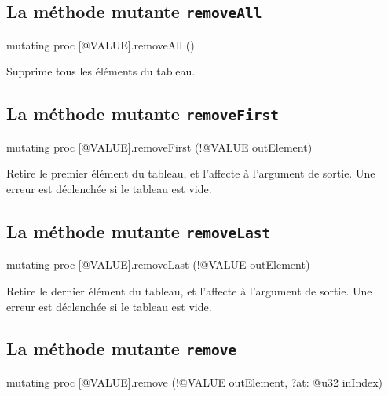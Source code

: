 \subsection{La méthode mutante \texttt{removeAll}}

\begin{galgas4box}
mutating proc [@VALUE].removeAll ()
\end{galgas4box}

Supprime tous les éléments du tableau.





\subsection{La méthode mutante \texttt{removeFirst}}

\begin{galgas4box}
mutating proc [@VALUE].removeFirst (!@VALUE outElement)
\end{galgas4box}

Retire le premier élément du tableau, et l'affecte à l'argument de sortie. Une erreur est déclenchée si le tableau est vide.







\subsection{La méthode mutante \texttt{removeLast}}

\begin{galgas4box}
mutating proc [@VALUE].removeLast (!@VALUE outElement)
\end{galgas4box}

Retire le dernier élément du tableau, et l'affecte à l'argument de sortie. Une erreur est déclenchée si le tableau est vide.








\subsection{La méthode mutante \texttt{remove}}

\begin{galgas4box}
mutating proc [@VALUE].remove (!@VALUE outElement, ?at: @u32 inIndex)
\end{galgas4box}

